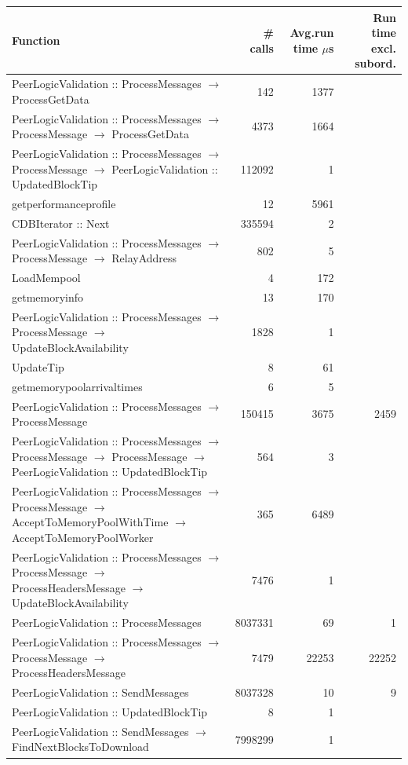 \documentclass{article}
\begin{document}
\begin{table}
\begin{longtable}{P{8cm}|r|r|r}
	Function&\# calls& Avg.run time $\mu$s& Run time excl. subord. \\\hline
	PeerLogicValidation :: ProcessMessages $\to$ ProcessGetData& 142& 1377&\\\hline
	PeerLogicValidation :: ProcessMessages $\to$ ProcessMessage $\to$ ProcessGetData& 4373& 1664&\\\hline
	PeerLogicValidation :: ProcessMessages $\to$ ProcessMessage $\to$ PeerLogicValidation :: UpdatedBlockTip& 112092& 1&\\\hline
	getperformanceprofile& 12& 5961&\\\hline
	CDBIterator :: Next& 335594& 2&\\\hline
	PeerLogicValidation :: ProcessMessages $\to$ ProcessMessage $\to$ RelayAddress& 802& 5&\\\hline
	LoadMempool& 4& 172&\\\hline
	getmemoryinfo& 13& 170&\\\hline
	PeerLogicValidation :: ProcessMessages $\to$ ProcessMessage $\to$ UpdateBlockAvailability& 1828& 1&\\\hline
	UpdateTip& 8& 61&\\\hline
	getmemorypoolarrivaltimes& 6& 5&\\\hline
	PeerLogicValidation :: ProcessMessages $\to$ ProcessMessage& 150415& 3675&2459\\\hline
	PeerLogicValidation :: ProcessMessages $\to$ ProcessMessage $\to$ ProcessMessage $\to$ PeerLogicValidation :: UpdatedBlockTip& 564& 3&\\\hline
	PeerLogicValidation :: ProcessMessages $\to$ ProcessMessage $\to$ AcceptToMemoryPoolWithTime $\to$ AcceptToMemoryPoolWorker& 365& 6489&\\\hline
	PeerLogicValidation :: ProcessMessages $\to$ ProcessMessage $\to$ ProcessHeadersMessage $\to$ UpdateBlockAvailability& 7476& 1&\\\hline
	PeerLogicValidation :: ProcessMessages& 8037331& 69&1\\\hline
	PeerLogicValidation :: ProcessMessages $\to$ ProcessMessage $\to$ ProcessHeadersMessage& 7479& 22253&22252\\\hline
	PeerLogicValidation :: SendMessages& 8037328& 10&9\\\hline
	PeerLogicValidation :: UpdatedBlockTip& 8& 1&\\\hline
	PeerLogicValidation :: SendMessages $\to$ FindNextBlocksToDownload& 7998299& 1&\\\hline

\end{longtable}
\end{table}
\end{document}
